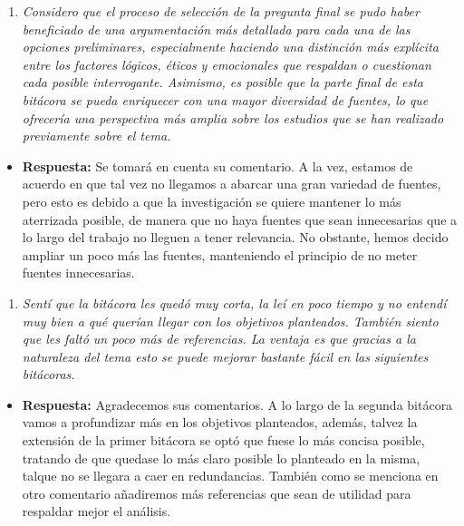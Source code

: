 \documentclass[
  letterpaper,
  DIV=11,
  numbers=noendperiod]{scrreprt}
\providecommand{\tightlist}{%
  \setlength{\itemsep}{0pt}\setlength{\parskip}{0pt}}\usepackage{longtable,booktabs,array}
\begin{document}
\begin{enumerate}
\def\labelenumi{\arabic{enumi}.}
\setcounter{enumi}{2}
\tightlist
\item
  \emph{Considero que el proceso de selección de la pregunta final se
  pudo haber beneficiado de una argumentación más detallada para cada
  una de las opciones preliminares, especialmente haciendo una
  distinción más explícita entre los factores lógicos, éticos y
  emocionales que respaldan o cuestionan cada posible interrogante.
  Asimismo, es posible que la parte final de esta bitácora se pueda
  enriquecer con una mayor diversidad de fuentes, lo que ofrecería una
  perspectiva más amplia sobre los estudios que se han realizado
  previamente sobre el tema.}\\
\end{enumerate}

\begin{itemize}
\tightlist
\item
  \textbf{Respuesta:} Se tomará en cuenta su comentario. A la vez,
  estamos de acuerdo en que tal vez no llegamos a abarcar una gran
  variedad de fuentes, pero esto es debido a que la investigación se
  quiere mantener lo más aterrizada posible, de manera que no haya
  fuentes que sean innecesarias que a lo largo del trabajo no lleguen a
  tener relevancia. No obstante, hemos decido ampliar un poco más las
  fuentes, manteniendo el principio de no meter fuentes innecesarias.
\end{itemize}

\begin{enumerate}
\def\labelenumi{\arabic{enumi}.}
\setcounter{enumi}{3}
\tightlist
\item
  \emph{Sentí que la bitácora les quedó muy corta, la leí en poco tiempo
  y no entendí muy bien a qué querían llegar con los objetivos
  planteados. También siento que les faltó un poco más de referencias.
  La ventaja es que gracias a la naturaleza del tema esto se puede
  mejorar bastante fácil en las siguientes bitácoras.}
\end{enumerate}

\begin{itemize}
\tightlist
\item
  \textbf{Respuesta:} Agradecemos sus comentarios. A lo largo de la
  segunda bitácora vamos a profundizar más en los objetivos planteados,
  además, talvez la extensión de la primer bitácora se optó que fuese lo
  más concisa posible, tratando de que quedase lo más claro posible lo
  planteado en la misma, talque no se llegara a caer en redundancias.
  También como se menciona en otro comentario añadiremos más referencias
  que sean de utilidad para respaldar mejor el análisis.
\end{itemize}
\end{document}
